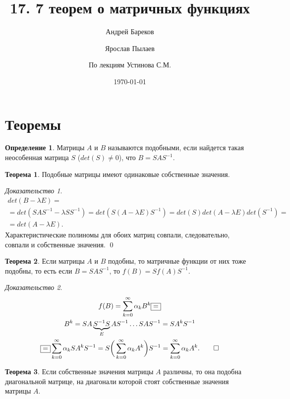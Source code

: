 \documentclass[a4paper,11pt]{article}
\title{17. 7 теорем о матричных функциях}
\author{Андрей Бареков \and Ярослав Пылаев \and По лекциям Устинова С.М.}
\date{\today}
\theoremstyle{definition}
\newtheorem{definition}{Определение}
\newtheorem{theorem}{Теорема}
\theoremstyle{remark}
\newtheorem*{evidence}{Доказательство}
\begin{document}
\maketitle
\newpage

\section{Теоремы}
\begin{definition}
  Матрицы $A$ и $B$ называются подобными, если найдется такая неособенная матрица $S$ ($det(S)\ne 0$), что
  $B=SAS^{-1}$.
\end{definition}
\begin{theorem}
  Подобные матрицы имеют одинаковые собственные значения.
\end{theorem}
\begin{evidence}
  \begin{gather*}
    det(B-\lambda E) = \\
    = det(SAS^{-1}-\lambda SS^{-1}) = det(S(A-\lambda E)S^{-1}) = det(S) det(A-\lambda E)det(S^{-1}) = \\
    = det(A-\lambda E).
  \end{gather*}
  Характеристические полиномы для обоих матриц совпали, следовательно, совпали и собственные значения.     \qed
\end{evidence}
\begin{theorem}
  Если матрицы $A$ и $B$ подобны, то матричные функции от них тоже подобны, то есть если $B=SAS^{-1}$, то $f(B)=Sf(A)S^{-1}$.
\end{theorem}
\begin{evidence}
  \begin{gather*}
    f(B) = \sum_{k=0}^{\infty}\alpha_kB^k \boxed{=} \\
    B^k = SA\underbrace{S^{-1}S}_{E}AS^{-1} \dots SAS^{-1} = SA^kS^{-1} \\
    \boxed{=} \sum_{k=0}^{\infty}\alpha_kSA^kS^{-1} = S\bigg(\sum_{k=0}^{\infty}\alpha_kA^k\bigg)S^{-1} = \sum_{k=0}^{\infty}\alpha_kA^k.     \qed %
  \end{gather*}
\end{evidence}
\begin{theorem}
  Если собственные значения матрицы $A$ различны, то она подобна диагональной матрице, на диагонали которой стоят собственные значения матрицы $A$.
\end{theorem}
\end{document}
